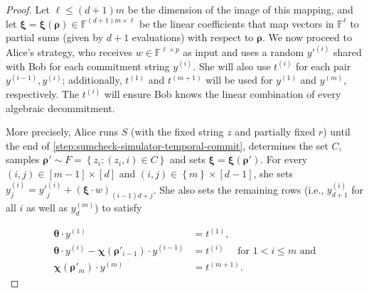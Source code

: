 \documentclass[10pt,a4paper]{article}
\theoremstyle{definition}
\newcommand{\field}{\mathbb{F}}
\renewcommand{\set}[1]{\left\{#1\right\}}
\newcommand{\vcommitstring}{z}
\newcommand{\pcommitlength}{p}
\newcommand{\pcommitstring}{y}
\newcommand{\dimension}{m}
\newcommand{\degree}{d}
\newcommand{\fingerprinttuple}{\bm{\rho}}
\begin{document}
\begin{proof}
    Let $\ell \leq (\degree + 1) \dimension$ be the dimension of the image of this mapping, and let $\bm{\xi} = \bm{\xi}(\fingerprinttuple) \in \field^{(\degree + 1)\dimension \times \ell}$ be the linear coefficients that map vectors in $\field^\ell$ to partial sums (given by $\degree + 1$ evaluations) with respect to $\fingerprinttuple$. We now proceed to Alice's strategy, who receives $w \in \field^{\ell \times \pcommitlength}$ as input and uses a random $\pcommitstring'^{(i)}$ shared with Bob for each commitment string $\pcommitstring^{(i)}$. She will also use $t^{(i)}$ for each pair $\pcommitstring^{(i-1)}, \pcommitstring^{(i)}$; additionally, $t^{(1)}$ and $t^{(\dimension + 1)}$ will be used for $\pcommitstring^{(1)}$ and $\pcommitstring^{(\dimension)}$, respectively. The $t^{(i)}$ will ensure Bob knows the linear combination of every algebraic decommitment.
    
    More precisely, Alice runs $S$ (with the fixed string $\vcommitstring$ and partially fixed $r$) until the end of \cref{step:sumcheck-simulator-temporal-commit}, determines the set $C$, samples $\fingerprinttuple' \sim F = \set{\vcommitstring_i : (\vcommitstring_i, i) \in C}$ and sets $\bm{\xi} = \bm{\xi}(\fingerprinttuple')$. For every $(i, j) \in [\dimension - 1] \times [\degree]$ and $(i, j) \in \set{\dimension} \times [\degree - 1]$, she sets $\pcommitstring^{(i)}_j = \pcommitstring'^{(i)}_j + \left(\bm{\xi} \cdot w\right)_{(i-1)\degree + j}$. She also sets the remaining rows (i.e., $\pcommitstring^{(i)}_{\degree + 1}$ for all $i$ as well as $\pcommitstring^{(\dimension)}_\degree$) to satisfy
    
    \begin{align*}
        \bm{\theta} \cdot \pcommitstring^{(1)} &= t^{(1)},\\
        \bm{\theta} \cdot \pcommitstring^{(i)} - \bm{\chi}(\fingerprinttuple'_{i-1}) \cdot \pcommitstring^{(i-1)} &= t^{(i)} \quad\text{ for } 1 < i \leq \dimension \text { and}\\
        \bm{\chi}(\fingerprinttuple'_\dimension) \cdot \pcommitstring^{(\dimension)} &= t^{(\dimension+1)}.
    \end{align*}
    

\end{proof}
\end{document}
